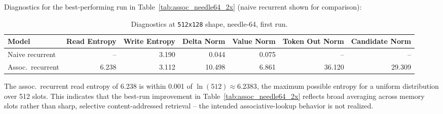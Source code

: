 \documentclass[10pt]{article} %
\begin{document}
Diagnostics for the best-performing run in
Table~\ref{tab:assoc_needle64_2x} (naive recurrent shown for comparison):

\begin{table}[h]
\centering
\caption{Diagnostics at \texttt{512x128} shape, needle-64, first run.}
\begin{tabular}{lrrrrrr}
\toprule
Model & Read Entropy & Write Entropy & Delta Norm & Value Norm & Token Out Norm & Candidate Norm \\
\midrule
Naive recurrent & -- & 3.190 & 0.044 & 0.075 & -- & -- \\
Assoc.\ recurrent & 6.238 & 3.112 & 10.498 & 6.861 & 36.120 & 29.309 \\
\bottomrule
\end{tabular}
\end{table}

\noindent The assoc.\ recurrent read entropy of 6.238 is within 0.001 of
$\ln(512) \approx 6.2383$, the maximum possible entropy for a uniform
distribution over 512 slots. This indicates that the best-run improvement
in Table~\ref{tab:assoc_needle64_2x} reflects broad averaging across memory
slots rather than sharp, selective content-addressed retrieval -- the
intended associative-lookup behavior is not realized.
\end{document}
